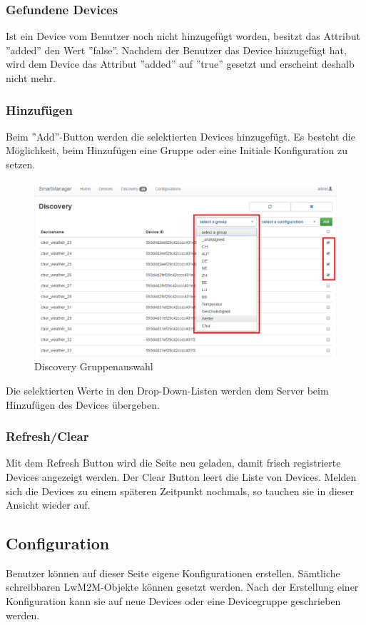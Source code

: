 \subsubsection{Gefundene Devices}
Ist ein Device vom Benutzer noch nicht hinzugefügt worden, besitzt das Attribut ''added'' den Wert ''false''. Nachdem der Benutzer das Device hinzugefügt hat, wird dem Device das Attribut ''added'' auf ''true'' gesetzt und erscheint deshalb nicht mehr.

\subsubsection{Hinzufügen}
Beim ''Add''-Button werden die selektierten Devices hinzugefügt. Es besteht die Möglichkeit, beim Hinzufügen eine Gruppe oder eine Initiale Konfiguration zu setzen.

\begin{figure}[H]
\centering
\includegraphics[scale=0.57]{../04_Realisierung/images/userinterface/discovery_addgroup.png}
\caption{Discovery Gruppenauswahl}
\end{figure}

Die selektierten Werte in den Drop-Down-Listen werden dem Server beim Hinzufügen des Devices übergeben.

\subsubsection{Refresh/Clear}
Mit dem Refresh Button wird die Seite neu geladen, damit frisch registrierte Devices angezeigt werden. Der Clear Button leert die Liste von Devices. Melden sich die Devices zu einem späteren Zeitpunkt nochmals, so tauchen sie in dieser Ansicht wieder auf.

\subsection{Configuration}
Benutzer können auf dieser Seite eigene Konfigurationen erstellen. Sämtliche schreibbaren LwM2M-Objekte können gesetzt werden. Nach der Erstellung einer Konfiguration kann sie auf neue Devices oder eine Devicegruppe geschrieben werden.

